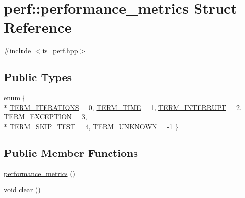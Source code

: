 \hypertarget{structperf_1_1performance__metrics}{\section{perf\-:\-:performance\-\_\-metrics Struct Reference}
\label{structperf_1_1performance__metrics}
}


{\ttfamily \#include $<$ts\-\_\-perf.\-hpp$>$}

\subsection*{Public Types}
\begin{DoxyCompactItemize}
\item 
enum \{ \\*
\hyperlink{structperf_1_1performance__metrics_a8e5b59009171fdb5d126a5a1050ba573ad660d78c688eb727d2c733bfca09c681}{T\-E\-R\-M\-\_\-\-I\-T\-E\-R\-A\-T\-I\-O\-N\-S} = 0, 
\hyperlink{structperf_1_1performance__metrics_a8e5b59009171fdb5d126a5a1050ba573a5a6caeeb25ffda8e716fd7ce5c9646eb}{T\-E\-R\-M\-\_\-\-T\-I\-M\-E} = 1, 
\hyperlink{structperf_1_1performance__metrics_a8e5b59009171fdb5d126a5a1050ba573ac27d7fec15c6462885c8c316b6b33038}{T\-E\-R\-M\-\_\-\-I\-N\-T\-E\-R\-R\-U\-P\-T} = 2, 
\hyperlink{structperf_1_1performance__metrics_a8e5b59009171fdb5d126a5a1050ba573a8300e0c7213502848912fdee65c31c2c}{T\-E\-R\-M\-\_\-\-E\-X\-C\-E\-P\-T\-I\-O\-N} = 3, 
\\*
\hyperlink{structperf_1_1performance__metrics_a8e5b59009171fdb5d126a5a1050ba573acfaecc692fc0f054e6f7e522b376fc6c}{T\-E\-R\-M\-\_\-\-S\-K\-I\-P\-\_\-\-T\-E\-S\-T} = 4, 
\hyperlink{structperf_1_1performance__metrics_a8e5b59009171fdb5d126a5a1050ba573a4c97742fbd6a1fe57d1a3d9b30f8ed26}{T\-E\-R\-M\-\_\-\-U\-N\-K\-N\-O\-W\-N} = -\/1
 \}
\end{DoxyCompactItemize}
\subsection*{Public Member Functions}
\begin{DoxyCompactItemize}
\item 
\hyperlink{structperf_1_1performance__metrics_aec9c0d13f9fcd817419117df79ad881a}{performance\-\_\-metrics} ()
\item 
\hyperlink{legacy_8hpp_a8bb47f092d473522721002c86c13b94e}{void} \hyperlink{structperf_1_1performance__metrics_a83d35e43043d4b52c39b9fa62ea8272a}{clear} ()
\end{DoxyCompactItemize}
